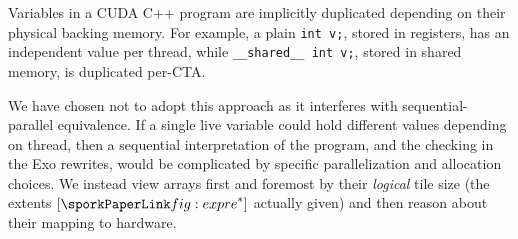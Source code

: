 
Variables in a CUDA C++ program \cite{cuda} are implicitly duplicated depending on their physical backing memory.
For example, a plain \texttt{int v;}, stored in registers, has an independent value per thread,
while \texttt{\_\_shared\_\_ int v;}, stored in shared memory, is duplicated per-CTA.

We have chosen not to adopt this approach as it interferes with sequential-parallel equivalence.
If a single live variable could hold different values depending on thread,
then a sequential interpretation of the program,
and the checking in the Exo rewrites,
would be complicated by specific parallelization and allocation choices.
We instead view arrays first and foremost by their \emph{logical} tile size
(the extents $[\sporkexpr^*]$ actually given)
and then reason about their mapping to hardware.

